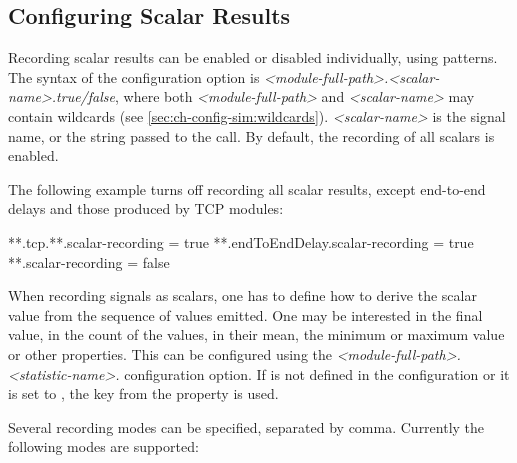 \subsection{Configuring Scalar Results}
\label{sec:ana-sim:scalar-results}

Recording scalar results can be enabled or disabled individually, using
patterns. The syntax of the configuration option is
\textit{<module-full-path>.<scalar-name>.}\textit{true/false},
where both \textit{<module-full-path>} and \textit{<scalar-name>}
may contain wildcards (see \ref{sec:ch-config-sim:wildcards}).
\textit{<scalar-name>} is the signal name, or the string passed to the
 call. By default, the recording of all scalars is
enabled.

The following example turns off recording all scalar results, except
end-to-end delays and those produced by TCP modules:

\begin{inifile}
**.tcp.**.scalar-recording = true
**.endToEndDelay.scalar-recording = true
**.scalar-recording = false
\end{inifile}


When recording signals as scalars, one has to define how to derive the
scalar value from the sequence of values emitted. One may be interested
in the final value, in the count of the values, in their mean, the minimum
or maximum value or other properties. This can be configured using the
\textit{<module-full-path>.<statistic-name>.}
configuration option. If  is not defined
in the configuration or it is set to , the  key
from the  property is used.

Several recording modes can be specified, separated by comma.
Currently the following modes are supported:

